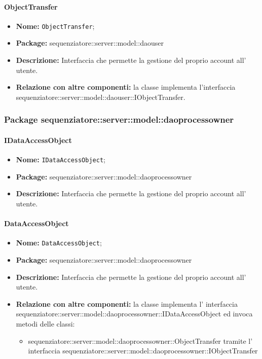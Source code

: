 \paragraph{ObjectTransfer}
	\begin{itemize}
		\item \textbf{Nome:} \texttt{ObjectTransfer};
		\item \textbf{Package:} sequenziatore::server::model::daouser
		\item \textbf{Descrizione:} Interfaccia che permette la gestione del proprio account all' utente.
		\item \textbf{Relazione con altre componenti:} la classe implementa l'interfaccia sequenziatore::server::model::daouser::IObjectTransfer.
	\end{itemize}
\subsubsection{Package sequenziatore::server::model::daoprocessowner}
\paragraph{IDataAccessObject}
	\begin{itemize}
		\item \textbf{Nome:} \texttt{IDataAccessObject};
		\item \textbf{Package:} sequenziatore::server::model::daoprocessowner
		\item \textbf{Descrizione:} Interfaccia che permette la gestione del proprio account all' utente.
	\end{itemize}
\paragraph{DataAccessObject}
\begin{itemize}
		\item \textbf{Nome:} \texttt{DataAccessObject};
		\item \textbf{Package:} sequenziatore::server::model::daoprocessowner
		\item \textbf{Descrizione:} Interfaccia che permette la gestione del proprio account all' utente.
		\item \textbf{Relazione con altre componenti:} la classe implementa l' interfaccia sequenziatore::server::model::daoprocessowner::IDataAccessObject ed invoca metodi delle classi:
		\begin{itemize}
			\item sequenziatore::server::model::daoprocessowner::ObjectTransfer tramite l' interfaccia sequenziatore::server::model::daoprocessowner::IObjectTransfer
		\end{itemize}
\end{itemize}
